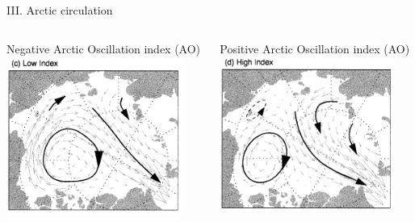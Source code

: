 \documentclass[8pt]{beamer}
\begin{document}
\setwatermark{\fontsize{125pt}{125pt}\selectfont{}}
\begin{frame}[fragile]{III. Arctic circulation}
	\begin{columns}
		Negative Arctic Oscillation index (AO)
		\includegraphics[width=0.9\textwidth]{./img/LowAO_Rigor.PNG}

		Positive Arctic Oscillation index (AO)	\includegraphics[width=0.9\textwidth]{./img/HighAO_Rigor.PNG}
\end{columns}
\end{frame}
\end{document}
